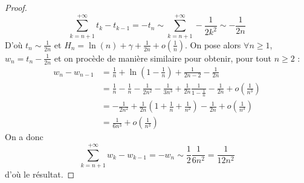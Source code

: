 \begin{proof}
    \[ \sum_{k=n+1}^{+\infty} t_k - t_{k-1} = -t_n \sim \sum_{k=n+1}^{+\infty} -\frac{1}{2k^2} \sim -\frac{1}{2n} \]
    D'où $t_n \sim \frac{1}{2n}$ et $H_n = \ln(n) + \gamma + \frac{1}{2n} + o\left( \frac{1}{n} \right)$. On pose alors $\forall n \geq 1$, $w_n = t_n - \frac{1}{2n}$ et on procède de manière similaire pour obtenir, pour tout $n \geq 2$ :
    \begin{align*}
      w_n - w_{n-1} &= \frac{1}{n} + \ln \left( 1 - \frac{1}{n} \right) + \frac{1}{2n-2} - \frac{1}{2n} \\
      &= \frac{1}{n} - \frac{1}{n} - \frac{1}{2n^2} - \frac{1}{3n^3} + \frac{1}{2n} \frac{1}{1 - \frac{1}{n}} - \frac{1}{2n} + o\left( \frac{1}{n^3} \right) \\
      &= - \frac{1}{2n^2} + \frac{1}{2n} \left( 1 + \frac{1}{n} + \frac{1}{n^2} \right) - \frac{1}{2n} + o\left( \frac{1}{n^3} \right) \\
      &= \frac{1}{6n^3} + o\left( \frac{1}{n^3} \right)
    \end{align*}
    On a donc
    \[ \sum_{k=n+1}^{+\infty} w_k - w_{k-1} = -w_n \sim \frac{1}{2} \frac{1}{6n^2} = \frac{1}{12n^2} \]
    d'où le résultat.
  \end{proof}

